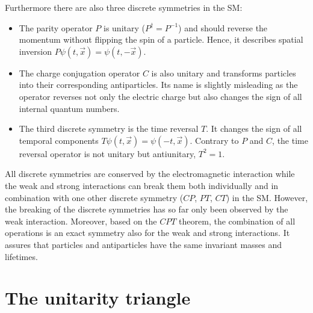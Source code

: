 Furthermore there are also three discrete symmetries in the \ac{SM}:
\begin{itemize}
	\item The parity operator $P$ is unitary ($P^{\dagger}=P^{-1}$) and should reverse the momentum without flipping the spin of a particle.
		Hence, it describes spatial inversion $P\psi\left(t,\vec{x}\right) = \psi\left(t,-\vec{x}\right)$.
	\item The charge conjugation operator $C$ is also unitary and transforms particles into their corresponding antiparticles.
		Its name is slightly misleading as the operator reverses not only the electric charge but also changes the sign of all internal quantum numbers.
	\item The third discrete symmetry is the time reversal $T$.
		It changes the sign of all temporal components $T\psi\left(t,\vec{x}\right) = \psi\left(-t,\vec{x}\right)$.
		Contrary to $P$ and $C$, the time reversal operator is not unitary but antiunitary, \ie $T^2=1$.
\end{itemize}
All discrete symmetries are conserved by the electromagnetic interaction while the weak and strong interactions can break them both
individually and in combination with one other discrete symmetry ($CP$, $PT$, $CT$) in the \ac{SM}.
However, the breaking of the discrete symmetries has so far only been observed by the weak interaction.
Moreover, based on the $CPT$ theorem, the combination of all operations is an exact symmetry also for the weak and strong interactions.
It assures that particles and antiparticles have the same invariant masses and lifetimes.

\section{The unitarity triangle}
\label{sec:unitarityTriangle}

